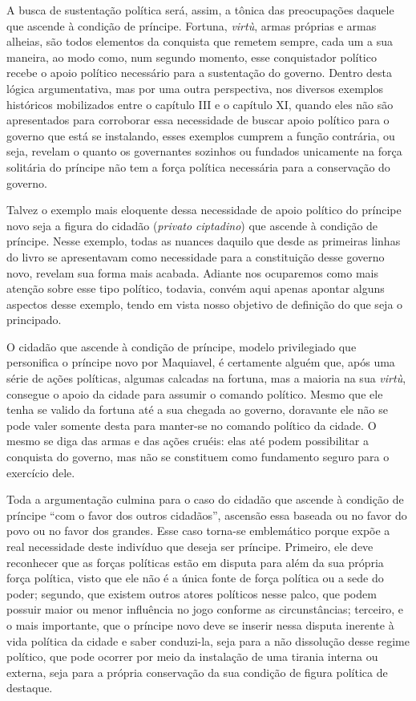 A busca de sustentação política será, assim, a tônica das preocupações
daquele que ascende à condição de príncipe. Fortuna, \emph{virtù}, armas
próprias e armas alheias, são todos elementos da conquista que remetem
sempre, cada um a sua maneira, ao modo como, num segundo momento, esse
conquistador político recebe o apoio político necessário para a
sustentação do governo. Dentro desta lógica argumentativa, mas por uma
outra perspectiva, nos diversos exemplos históricos mobilizados entre o
capítulo III e o capítulo XI, quando eles não são apresentados para
corroborar essa necessidade de buscar apoio político para o governo que
está se instalando, esses exemplos cumprem a função contrária, ou seja,
revelam o quanto os governantes sozinhos ou fundados unicamente na força
solitária do príncipe não tem a força política necessária para a
conservação do governo.

Talvez o exemplo mais eloquente dessa necessidade de apoio político do
príncipe novo seja a figura do cidadão (\emph{privato ciptadino}) que
ascende à condição de príncipe. Nesse exemplo, todas as nuances daquilo
que desde as primeiras linhas do livro se apresentavam como necessidade
para a constituição desse governo novo, revelam sua forma mais acabada.
Adiante nos ocuparemos como mais atenção sobre esse tipo político,
todavia, convém aqui apenas apontar alguns aspectos desse exemplo, tendo
em vista nosso objetivo de definição do que seja o principado.

O cidadão que ascende à condição de príncipe, modelo privilegiado que
personifica o príncipe novo por Maquiavel, é certamente alguém que, após
uma série de ações políticas, algumas calcadas na fortuna, mas a maioria
na sua \emph{virtù}, consegue o apoio da cidade para assumir o comando
político. Mesmo que ele tenha se valido da fortuna até a sua chegada ao
governo, doravante ele não se pode valer somente desta para manter-se no
comando político da cidade. O mesmo se diga das armas e das ações
cruéis: elas até podem possibilitar a conquista do governo, mas não se
constituem como fundamento seguro para o exercício dele.

Toda a argumentação culmina para o caso do cidadão que ascende à
condição de príncipe ``com o favor dos outros cidadãos'', ascensão essa
baseada ou no favor do povo ou no favor dos grandes. Esse caso torna-se
emblemático porque expõe a real necessidade deste indivíduo que deseja
ser príncipe. Primeiro, ele deve reconhecer que as forças políticas
estão em disputa para além da sua própria força política, visto que ele
não é a única fonte de força política ou a sede do poder; segundo, que
existem outros atores políticos nesse palco, que podem possuir maior ou
menor influência no jogo conforme as circunstâncias; terceiro, e o mais
importante, que o príncipe novo deve se inserir nessa disputa inerente à
vida política da cidade e saber conduzi-la, seja para a não dissolução
desse regime político, que pode ocorrer por meio da instalação de uma
tirania interna ou externa, seja para a própria conservação da sua
condição de figura política de destaque.

